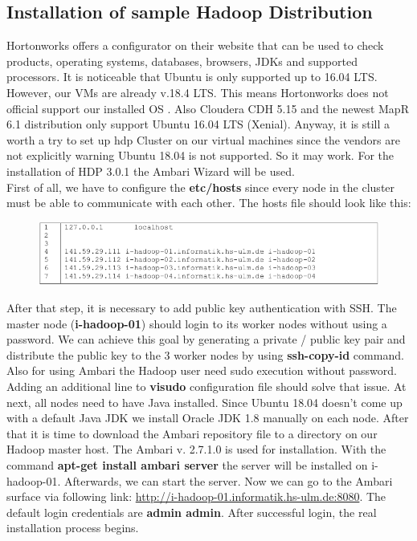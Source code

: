 \subsection{Installation of sample Hadoop Distribution}\label{intallhadoop}
Hortonworks offers a configurator on their website that can be used to check products, operating systems,
databases, browsers, JDKs and supported processors. It is noticeable that Ubuntu is only supported up to
16.04 LTS. However, our VMs are already v.18.4 LTS. This means Hortonworks does not official support
our installed OS \citep{Hortonworks2018a}. Also Cloudera CDH 5.15 \citep{Cloudera2018b} and the newest MapR 6.1 distribution \cite{MapR2018} only support Ubuntu 16.04 LTS (Xenial). Anyway, it is still a worth a try to set up \acs{hdp} Cluster on our virtual machines since the vendors are not explicitly warning Ubuntu 18.04 is not supported. So it may work. For the installation of HDP 3.0.1 the Ambari Wizard \citep{Hortonworks2018} will be used.\\First of all, we have to configure the \textbf{etc/hosts} since every node in the cluster must be able to communicate with each other. The hosts file should look like this:
\begin{figure}[H]
\hspace{-1.3cm}
\includegraphics[width=1.2\textwidth]{img/etchost}
\label{pic:etchost}
\end{figure}
\noindent After that step, it is necessary to add public key authentication with SSH. The master node (\textbf{i-hadoop-01}) should login to its worker nodes without using a password. We can achieve this goal by generating a private / public key pair and distribute the public key to the 3 worker nodes by using \textbf{ssh-copy-id} command. Also for using Ambari the Hadoop user need sudo execution without password. Adding an additional line to \textbf{visudo} configuration file should solve that issue. At next, all nodes need to have Java installed. Since Ubuntu 18.04 doesn’t come up with a default Java JDK
we install Oracle JDK 1.8 manually on each node. After that it is time to download the Ambari repository
file to a directory on our Hadoop master host. The Ambari v. 2.7.1.0 is used for installation. With the command \textbf{apt-get install ambari server} the server will be installed on i-hadoop-01. Afterwards, we can start the server. Now we can go to the Ambari surface via following link: \href{http://i-hadoop-01.informatik.hs-ulm.de:8080}{http://i-hadoop-01.informatik.hs-ulm.de:8080}. The default login credentials are \textbf{admin admin}. After successful login, the real installation process begins.
